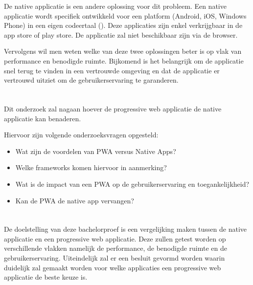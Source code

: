 De native applicatie is een andere oplossing voor dit probleem. Een native applicatie wordt specifiek ontwikkeld voor een platform (Android, iOS, Windows Phone) in een eigen codeertaal (\cite{DIFF_NATIVEAPP_PWA}). Deze applicaties zijn enkel verkrijgbaar in de app store of play store. De applicatie zal niet beschikbaar zijn via de browser.

Vervolgens wil men weten welke van deze twee oplossingen beter is op vlak van performance en benodigde ruimte. Bijkomend is het belangrijk om de applicatie snel terug te vinden in een vertrouwde omgeving en dat de applicatie er vertrouwd uitziet om de gebruikerservaring te garanderen.


\section{}
\label{sec:onderzoeksvraag}
Dit onderzoek zal nagaan hoever de progressive web applicatie de native applicatie kan benaderen. 

Hiervoor zijn volgende onderzoeksvragen opgesteld:
\begin{itemize}
	\item Wat zijn de voordelen van PWA versus Native Apps?
	\item Welke frameworks komen hiervoor in aanmerking?
	\item  Wat is de impact van een PWA op de gebruikerservaring en toegankelijkheid?
	\item Kan de PWA de native app vervangen?
\end{itemize}

\section{}
\label{sec:onderzoeksdoelstelling}

De doelstelling van deze bachelorproef is een vergelijking maken tussen de native applicatie en een progressive web applicatie. Deze zullen getest worden op verschillende vlakken namelijk de performance, de benodigde ruimte en de gebruikerservaring. Uiteindelijk zal er een besluit gevormd worden waarin duidelijk zal gemaakt worden voor welke applicaties een progressive web applicatie de beste keuze is.

\section{}
\label{sec:opzet-bachelorproef}

